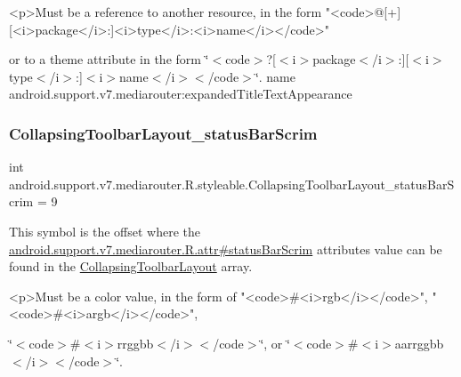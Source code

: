\begin{DoxyVerb}      <p>Must be a reference to another resource, in the form "<code>@[+][<i>package</i>:]<i>type</i>:<i>name</i></code>"
\end{DoxyVerb}
 or to a theme attribute in the form \char`\"{}$<$code$>$?\mbox{[}$<$i$>$package$<$/i$>$\+:\mbox{]}\mbox{[}$<$i$>$type$<$/i$>$\+:\mbox{]}$<$i$>$name$<$/i$>$$<$/code$>$\char`\"{}.  name android.\+support.\+v7.\+mediarouter\+:expanded\+Title\+Text\+Appearance \mbox{\label{classandroid_1_1support_1_1v7_1_1mediarouter_1_1R_1_1styleable_a33838f98949a195055bcd027fb0c8e1c}} 
\subsubsection{\texorpdfstring{Collapsing\+Toolbar\+Layout\+\_\+status\+Bar\+Scrim}{CollapsingToolbarLayout\_statusBarScrim}}
{\footnotesize\ttfamily int android.\+support.\+v7.\+mediarouter.\+R.\+styleable.\+Collapsing\+Toolbar\+Layout\+\_\+status\+Bar\+Scrim = 9\hspace{0.3cm}{\ttfamily [static]}}

This symbol is the offset where the \hyperlink{classandroid_1_1support_1_1v7_1_1mediarouter_1_1R_1_1attr_aedf7a192f38a7835b73424353ad41371}{android.\+support.\+v7.\+mediarouter.\+R.\+attr\#status\+Bar\+Scrim} attribute\textquotesingle{}s value can be found in the \hyperlink{classandroid_1_1support_1_1v7_1_1mediarouter_1_1R_1_1styleable_aae2cb4975e9b9a19d129888f497cc386}{Collapsing\+Toolbar\+Layout} array.

\begin{DoxyVerb}      <p>Must be a color value, in the form of "<code>#<i>rgb</i></code>", "<code>#<i>argb</i></code>",
\end{DoxyVerb}
 \char`\"{}$<$code$>$\#$<$i$>$rrggbb$<$/i$>$$<$/code$>$\char`\"{}, or \char`\"{}$<$code$>$\#$<$i$>$aarrggbb$<$/i$>$$<$/code$>$\char`\"{}. 

